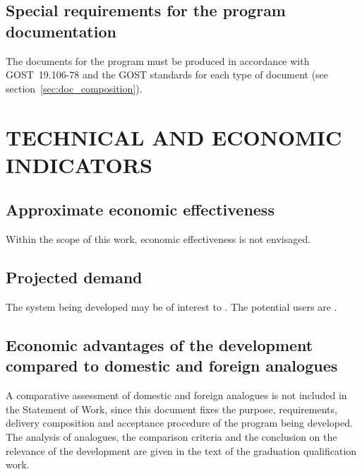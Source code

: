\documentclass[12pt,a4paper]{extarticle}
\begin{document}
\subsection{Special requirements for the program documentation}
\label{sec:doc_reqs}

The documents for the program must be produced in accordance with GOST~19.106-78 and the GOST standards for each type of document (see section~\ref{sec:doc_composition}).

\clearpage

\section{TECHNICAL AND ECONOMIC INDICATORS}

\subsection{Approximate economic effectiveness}

Within the scope of this work, economic effectiveness is not envisaged.

\subsection{Projected demand}

The system being developed may be of interest to . The potential users are .

\subsection{Economic advantages of the development compared to domestic and foreign analogues}

A comparative assessment of domestic and foreign analogues is not included in the Statement of Work, since this document fixes the purpose, requirements, delivery composition and acceptance procedure of the program being developed. The analysis of analogues, the comparison criteria and the conclusion on the relevance of the development are given in the text of the graduation qualification work.

\clearpage

\end{document}

